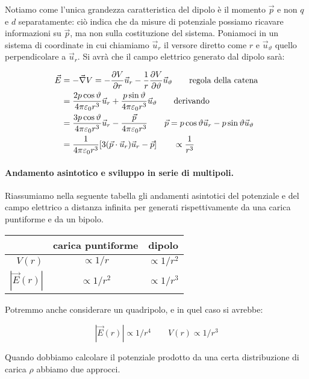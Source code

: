 Notiamo come l'unica grandezza caratteristica del dipolo è il momento $ \vec{p}  $ e non $q$ e $d$ separatamente: ciò indica che da misure di potenziale possiamo ricavare informazioni su $\vec{p}$, ma non sulla costituzione del sistema.
Poniamoci in un sistema di coordinate in cui chiamiamo $ \vec{u}_r $ il versore diretto come $ r $ e $ \vec{u}_{\vartheta} $ quello perpendicolare a $ \vec{u}_r $. Si avrà che il campo elettrico generato dal dipolo sarà:

\begin{align*}
	\vec{E} &= - \vec{\nabla} V = -\frac{\partial V}{\partial r} \vec{u}_r - \frac{1}{r} \frac{\partial V}{\partial \vartheta} \vec{u}_{\vartheta} \tag*{regola della catena}\\
	&= \frac{2p\cos \vartheta}{4\pi \varepsilon_0 r^3} \vec{u}_r + \frac{p\sin \vartheta}{4\pi \varepsilon_0 r^3} \vec{u}_{\vartheta} \tag*{derivando} \\
	&= \frac{3p\cos \vartheta}{4\pi \varepsilon_0 r^3}\vec{u}_r - \frac{\vec{p}}{4\pi \varepsilon_0 r^3} \tag*{$\vec{p} =p\cos \vartheta \vec{u}_r - p \sin \vartheta \vec{u}_{\vartheta}$} \\
	&= \frac{1}{4\pi \varepsilon_0 r^3}[3(\vec{p} \cdot \vec{u}_r)\vec{u}_r-\vec{p}] \qquad \propto \frac{1}{r^3}
\end{align*}

\paragraph{Andamento asintotico e sviluppo in serie di multipoli.}Riassumiamo nella seguente tabella gli andamenti asintotici del potenziale e del campo elettrico a distanza infinita per generati rispettivamente da una carica puntiforme e da un bipolo.

\begin{table}[htpb]
	\centering
	\begin{tabular}{r|c|c}
		& carica puntiforme & dipolo \\
		\hline
		$V(r)$ & $ \propto 1/r $ & $ \propto 1/r^2  $ \\
		\hline
		$ |\vec{E} (r)| $ & $ \propto 1/r^2 $ & $ \propto 1/r^3  $
	\end{tabular}
\end{table}

Potremmo anche considerare un quadripolo, e in quel caso si avrebbe:

\[
	|\vec{E} (r)| \propto 1/r^4 \qquad V(r) \propto 1/r^3
\]

Quando dobbiamo calcolare il potenziale prodotto da una certa distribuzione di carica $ \rho  $ abbiamo due approcci.

